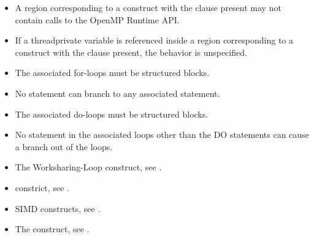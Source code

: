 \begin{itemize}
\item A  region corresponding to a  construct with the
     clause present may not contain calls to the OpenMP Runtime
    API.

\item If a threadprivate variable is referenced inside a  region
    corresponding to a  construct with the  clause
    present, the behavior is unspecified.

\end{itemize}

\begin{ccppspecific}
\begin{itemize}

  \item The associated for-loops must be structured blocks.

  \item No statement can branch to any associated  statement.

\end{itemize}

\end{ccppspecific}

\begin{fortranspecific}
\begin{itemize}

  \item The associated do-loops must be structured blocks.

  \item No statement in the associated loops other than the DO statements can cause
    a branch out of the loops.


\end{itemize}
\end{fortranspecific}

\crossreferences
\begin{itemize}
  \item The Worksharing-Loop construct, see .

  \item {} constrict, see .

  \item SIMD constructs, see .

  \item The  construct, see .

\end{itemize}
